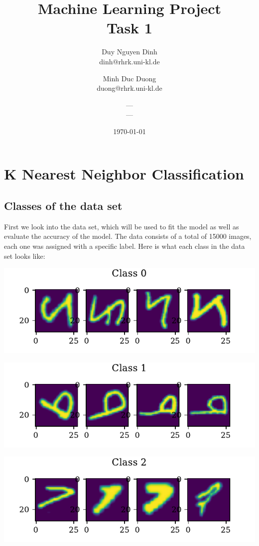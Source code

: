 \documentclass[11pt]{article}
\title{Machine Learning Project\\Task 1}
\author{Duy Nguyen Dinh \\ dinh@rhrk.uni-kl.de\and
	Minh Duc Duong\\ duong@rhrk.uni-kl.de\and
    ---\\ ---}
\date{\today}
\begin{document}
\maketitle

\section{K Nearest Neighbor Classification}

\subsection{Classes of the data set}
First we look into the data set, which will be used to fit the model as well as evaluate the accuracy of the model. The data consists of a total of 15000 images, each one was assigned with a specific label. Here is what each class in the data set looks like:

\includegraphics{figures/1a_sample_class_0.pdf}

\includegraphics{figures/1a_sample_class_1.pdf}

\includegraphics{figures/1a_sample_class_2.pdf}
\end{document}
